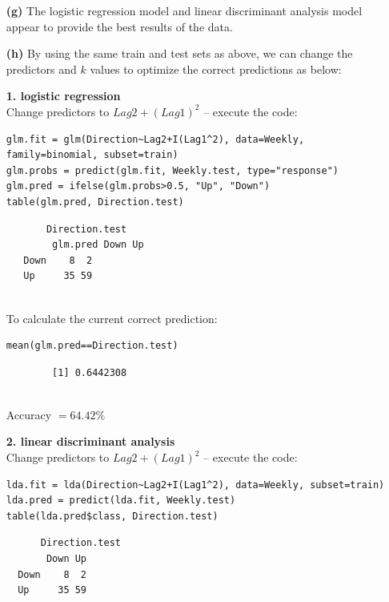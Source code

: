 \documentclass[twoside,11pt]{homework}
\begin{document}
\begin{enumerate}
		\item[\textbf{(g)}] The logistic regression model and linear discriminant analysis model appear to provide the best results of the data.
		
		\item[\textbf{(h)}] By using the same train and test sets as above, we can change the predictors and $k$ values to optimize the correct predictions as below:
		
		\textbf{1. logistic regression}\\
		Change predictors to $Lag2+(Lag1)^2$  -- execute the code:\\
		
		\begin{lstlisting}
glm.fit = glm(Direction~Lag2+I(Lag1^2), data=Weekly, family=binomial, subset=train)
glm.probs = predict(glm.fit, Weekly.test, type="response")
glm.pred = ifelse(glm.probs>0.5, "Up", "Down")
table(glm.pred, Direction.test)
		\end{lstlisting}
		
		\begin{verbatim}
       Direction.test
		glm.pred Down Up
   Down    8  2
   Up     35 59
   
		\end{verbatim}
		
		To calculate the current correct prediction:
		
		\begin{lstlisting}
mean(glm.pred==Direction.test)
		\end{lstlisting}
		
		\begin{verbatim}
		[1] 0.6442308
		
		\end{verbatim}
		
		Accuracy $=64.42\%$

		\textbf{2. linear discriminant analysis}\\
		Change predictors to $Lag2+(Lag1)^2$  -- execute the code:\\
		
		\begin{lstlisting}
lda.fit = lda(Direction~Lag2+I(Lag1^2), data=Weekly, subset=train)
lda.pred = predict(lda.fit, Weekly.test)
table(lda.pred$class, Direction.test)
		\end{lstlisting}
		
		\begin{verbatim}
      Direction.test
       Down Up
  Down    8  2
  Up     35 59
   

\end{verbatim}
\end{enumerate}
\end{document}
